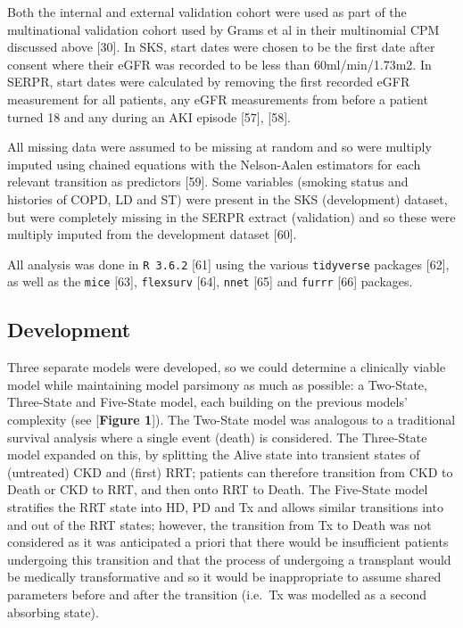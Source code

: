 \documentclass[12pt,twoside]{reedthesis}
\begin{document}
Both the internal and external validation cohort were used as part of the multinational validation cohort used by Grams et al in their multinomial CPM discussed above {[}30{]}. In SKS, start dates were chosen to be the first date after consent where their eGFR was recorded to be less than 60ml/min/1.73m2. In SERPR, start dates were calculated by removing the first recorded eGFR measurement for all patients, any eGFR measurements from before a patient turned 18 and any during an AKI episode {[}57{]}, {[}58{]}.

All missing data were assumed to be missing at random and so were multiply imputed using chained equations with the Nelson-Aalen estimators for each relevant transition as predictors {[}59{]}. Some variables (smoking status and histories of COPD, LD and ST) were present in the SKS (development) dataset, but were completely missing in the SERPR extract (validation) and so these were multiply imputed from the development dataset {[}60{]}.

All analysis was done in \texttt{R\ 3.6.2} {[}61{]} using the various \texttt{tidyverse} packages {[}62{]}, as well as the \texttt{mice} {[}63{]}, \texttt{flexsurv} {[}64{]}, \texttt{nnet} {[}65{]} and \texttt{furrr} {[}66{]} packages.

\hypertarget{development}{%
\subsection{Development}\label{development}}

Three separate models were developed, so we could determine a clinically viable model while maintaining model parsimony as much as possible: a Two-State, Three-State and Five-State model, each building on the previous models' complexity (see {[}\textbf{Figure 1}{]}). The Two-State model was analogous to a traditional survival analysis where a single event (death) is considered. The Three-State model expanded on this, by splitting the Alive state into transient states of (untreated) CKD and (first) RRT; patients can therefore transition from CKD to Death or CKD to RRT, and then onto RRT to Death. The Five-State model stratifies the RRT state into HD, PD and Tx and allows similar transitions into and out of the RRT states; however, the transition from Tx to Death was not considered as it was anticipated a priori that there would be insufficient patients undergoing this transition and that the process of undergoing a transplant would be medically transformative and so it would be inappropriate to assume shared parameters before and after the transition (i.e.~Tx was modelled as a second absorbing state).
\end{document}
